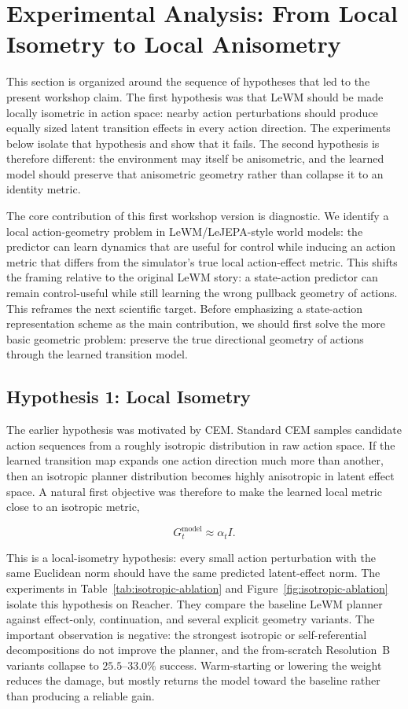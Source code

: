 ﻿\documentclass{article}
\begin{document}
\section{Experimental Analysis: From Local Isometry to Local Anisometry}
\label{sec:experimental-geometry}

This section is organized around the sequence of hypotheses that led to the
present workshop claim.  The first hypothesis was that LeWM should be made
locally isometric in action space: nearby action perturbations should produce
equally sized latent transition effects in every action direction.  The
experiments below isolate that hypothesis and show that it fails.  The second
hypothesis is therefore different: the environment may itself be anisometric,
and the learned model should preserve that anisometric geometry rather than
collapse it to an identity metric.

The core contribution of this first workshop version is diagnostic.  We
identify a local action-geometry problem in LeWM/LeJEPA-style world models:
the predictor can learn dynamics that are useful for control while inducing an
action metric that differs from the simulator's true local action-effect
metric.  This shifts the framing relative to the original LeWM story: a
state-action predictor can remain control-useful while still learning the wrong
pullback geometry of actions.  This reframes the next scientific target.  Before emphasizing a
state-action representation scheme as the main contribution, we should first
solve the more basic geometric problem: preserve the true directional geometry
of actions through the learned transition model.

\subsection{Hypothesis 1: Local Isometry}
\label{sec:isotropic-tests}

The earlier hypothesis was motivated by CEM.  Standard CEM samples candidate
action sequences from a roughly isotropic distribution in raw action space.  If
the learned transition map expands one action direction much more than another,
then an isotropic planner distribution becomes highly anisotropic in latent
effect space.  A natural first objective was therefore to make the learned
local metric close to an isotropic metric,

\[
G^{\mathrm{model}}_t \approx \alpha_t I.
\]

This is a local-isometry hypothesis: every small action perturbation with the
same Euclidean norm should have the same predicted latent-effect norm.  The
experiments in Table~\ref{tab:isotropic-ablation} and
Figure~\ref{fig:isotropic-ablation} isolate this hypothesis on Reacher.
They compare the baseline LeWM planner against effect-only, continuation, and
several explicit geometry variants.  The important observation is negative:
the strongest isotropic or self-referential decompositions do not improve the
planner, and the from-scratch Resolution~B variants collapse to
\(25.5\)--\(33.0\%\) success.  Warm-starting or lowering the weight reduces the
damage, but mostly returns the model toward the baseline rather than producing
a reliable gain.
\end{document}
